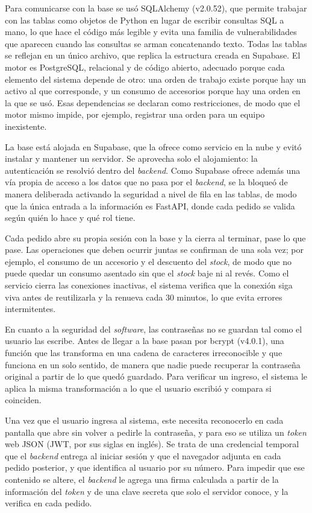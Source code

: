 \documentclass[10pt]{article}
\begin{document}
Para comunicarse con la base se usó SQLAlchemy (v2.0.52), que permite trabajar con las tablas como objetos de Python en lugar de escribir consultas SQL a mano, lo que hace el código más legible y evita una familia de vulnerabilidades que aparecen cuando las consultas se arman concatenando texto. Todas las tablas se reflejan en un único archivo, que replica la estructura creada en Supabase. El motor es PostgreSQL, relacional y de código abierto, adecuado porque cada elemento del sistema depende de otro: una orden de trabajo existe porque hay un activo al que corresponde, y un consumo de accesorios porque hay una orden en la que se usó. Esas dependencias se declaran como restricciones, de modo que el motor mismo impide, por ejemplo, registrar una orden para un equipo inexistente.

La base está alojada en Supabase, que la ofrece como servicio en la nube y evitó instalar y mantener un servidor. Se aprovecha solo el alojamiento: la autenticación se resolvió dentro del \textit{backend}. Como Supabase ofrece además una vía propia de acceso a los datos que no pasa por el \textit{backend}, se la bloqueó de manera deliberada activando la seguridad a nivel de fila en las tablas, de modo que la única entrada a la información es FastAPI, donde cada pedido se valida según quién lo hace y qué rol tiene.

Cada pedido abre su propia sesión con la base y la cierra al terminar, pase lo que pase. Las operaciones que deben ocurrir juntas se confirman de una sola vez; por ejemplo, el consumo de un accesorio y el descuento del \textit{stock}, de modo que no puede quedar un consumo asentado sin que el \textit{stock} baje ni al revés. Como el servicio cierra las conexiones inactivas, el sistema verifica que la conexión siga viva antes de reutilizarla y la renueva cada 30 minutos, lo que evita errores intermitentes.

En cuanto a la seguridad del \textit{software}, las contraseñas no se guardan tal como el usuario las escribe. Antes de llegar a la base pasan por bcrypt (v4.0.1), una función que las transforma en una cadena de caracteres irreconocible y que funciona en un solo sentido, de manera que nadie puede recuperar la contraseña original a partir de lo que quedó guardado. Para verificar un ingreso, el sistema le aplica la misma transformación a lo que el usuario escribió y compara si coinciden.

Una vez que el usuario ingresa al sistema, este necesita reconocerlo en cada pantalla que abre sin volver a pedirle la contraseña, y para eso se utiliza un \textit{token} web JSON (JWT, por sus siglas en inglés). Se trata de una credencial temporal que el \textit{backend} entrega al iniciar sesión y que el navegador adjunta en cada pedido posterior, y que identifica al usuario por su número. Para impedir que ese contenido se altere, el \textit{backend} le agrega una firma calculada a partir de la información del \textit{token} y de una clave secreta que solo el servidor conoce, y la verifica en cada pedido. 
\end{document}
